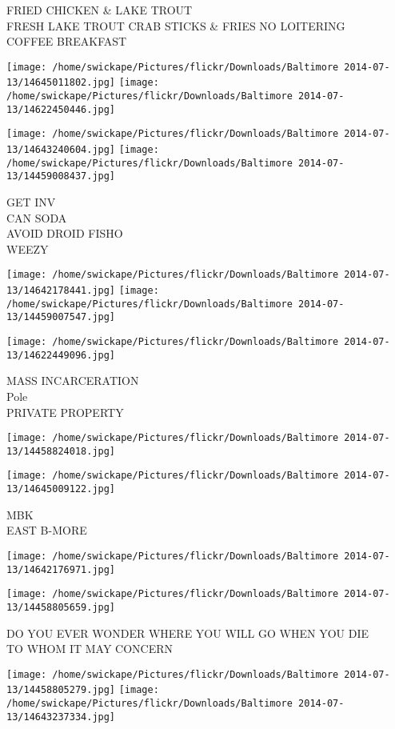 \documentclass[10pt,letterpaper]{article}
\begin{document}
FRIED CHICKEN \& LAKE TROUT\\
FRESH LAKE TROUT CRAB STICKS \& FRIES NO LOITERING\\
COFFEE BREAKFAST
\pagebreak

\texttt{[image: /home/swickape/Pictures/flickr/Downloads/Baltimore 2014-07-13/14645011802.jpg]}
\texttt{[image: /home/swickape/Pictures/flickr/Downloads/Baltimore 2014-07-13/14622450446.jpg]}

\texttt{[image: /home/swickape/Pictures/flickr/Downloads/Baltimore 2014-07-13/14643240604.jpg]}
\texttt{[image: /home/swickape/Pictures/flickr/Downloads/Baltimore 2014-07-13/14459008437.jpg]}

GET INV\\
CAN SODA\\
AVOID DROID FISHO\\
WEEZY
\pagebreak

\texttt{[image: /home/swickape/Pictures/flickr/Downloads/Baltimore 2014-07-13/14642178441.jpg]}
\texttt{[image: /home/swickape/Pictures/flickr/Downloads/Baltimore 2014-07-13/14459007547.jpg]}

\texttt{[image: /home/swickape/Pictures/flickr/Downloads/Baltimore 2014-07-13/14622449096.jpg]}

MASS INCARCERATION\\
Pole\\
PRIVATE PROPERTY
\pagebreak

\texttt{[image: /home/swickape/Pictures/flickr/Downloads/Baltimore 2014-07-13/14458824018.jpg]}

\vspace{0.25in}
\texttt{[image: /home/swickape/Pictures/flickr/Downloads/Baltimore 2014-07-13/14645009122.jpg]}

MBK\\
EAST B{-}MORE
\pagebreak

\texttt{[image: /home/swickape/Pictures/flickr/Downloads/Baltimore 2014-07-13/14642176971.jpg]}

\vspace{0.25in}
\texttt{[image: /home/swickape/Pictures/flickr/Downloads/Baltimore 2014-07-13/14458805659.jpg]}

DO YOU EVER WONDER WHERE YOU WILL GO WHEN YOU DIE\\
TO WHOM IT MAY CONCERN
\pagebreak

\texttt{[image: /home/swickape/Pictures/flickr/Downloads/Baltimore 2014-07-13/14458805279.jpg]}
\texttt{[image: /home/swickape/Pictures/flickr/Downloads/Baltimore 2014-07-13/14643237334.jpg]}
\end{document}
